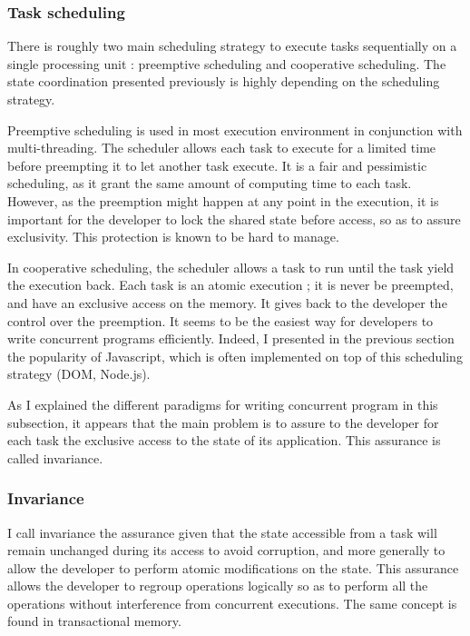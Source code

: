 \subsubsection{Task scheduling}

There is roughly two main scheduling strategy to execute tasks sequentially on a single processing unit : preemptive scheduling and cooperative scheduling.
The state coordination presented previously is highly depending on the scheduling strategy.

Preemptive scheduling is used in most execution environment in conjunction with multi-threading.
The scheduler allows each task to execute for a limited time before preempting it to let another task execute.
It is a fair and pessimistic scheduling, as it grant the same amount of computing time to each task.
However, as the preemption might happen at any point in the execution, it is important for the developer to lock the shared state before access, so as to assure exclusivity.
This protection is known to be hard to manage.

In cooperative scheduling, the scheduler allows a task to run until the task yield the execution back.
Each task is an atomic execution ; it is never be preempted, and have an exclusive access on the memory.
It gives back to the developer the control over the preemption.
It seems to be the easiest way for developers to write concurrent programs efficiently.
Indeed, I presented in the previous section the popularity of Javascript, which is often implemented on top of this scheduling strategy (DOM, Node.js).

As I explained the different paradigms for writing concurrent program in this subsection, it appears that the main problem is to assure to the developer for each task the exclusive access to the state of its application.
This assurance is called invariance.

\subsubsection{Invariance}

I call invariance the assurance given that the state accessible from a task will remain unchanged during its access to avoid corruption, and more generally to allow the developer to perform atomic modifications on the state.
This assurance allows the developer to regroup operations logically so as to perform all the operations without interference from concurrent executions.
The same concept is found in transactional memory.

